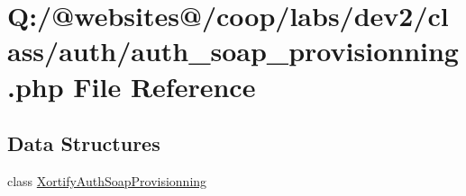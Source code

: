 \hypertarget{auth__soap__provisionning_8php}{\section{Q\-:/@websites@/coop/labs/dev2/class/auth/auth\-\_\-soap\-\_\-provisionning.php File Reference}
\label{auth__soap__provisionning_8php}
}
\subsection*{Data Structures}
\begin{DoxyCompactItemize}
\item 
class \hyperlink{class_xortify_auth_soap_provisionning}{Xortify\-Auth\-Soap\-Provisionning}
\end{DoxyCompactItemize}
